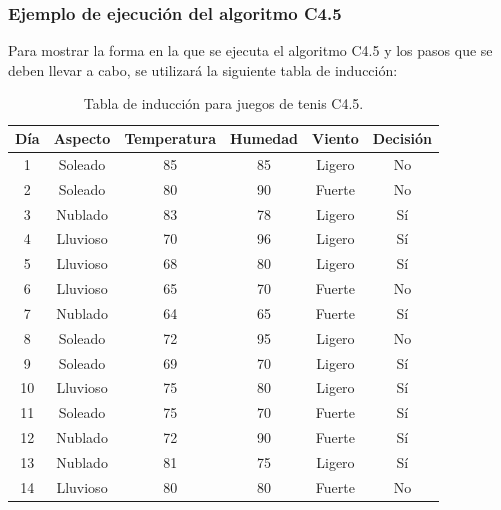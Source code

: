 \subsubsection{Ejemplo de ejecución del algoritmo C4.5}
Para mostrar la forma en la que se ejecuta el algoritmo C4.5 y los pasos que se deben llevar a cabo, se utilizará la siguiente tabla de inducción:

\begin{table}[H]
	\begin{center}
		\label{tab:tablaInduccionC4.5}
		\begin{tabular}{c|c|c|c|c|c}
			\textbf{Día} & \textbf{Aspecto} & \textbf{Temperatura} & \textbf{Humedad} & \textbf{Viento} & \textbf{Decisión}\\
			\hline
			1 & Soleado & 85 & 85 & Ligero & No\\
			2 & Soleado & 80 & 90 & Fuerte & No\\
			3 & Nublado & 83 & 78 & Ligero & Sí\\
			4 & Lluvioso & 70 & 96 & Ligero & Sí\\
			5 & Lluvioso & 68 & 80 & Ligero & Sí\\
			6 & Lluvioso & 65 & 70 & Fuerte & No\\
			7 & Nublado & 64 & 65 & Fuerte & Sí\\
			8 & Soleado & 72 & 95 & Ligero & No\\
			9 & Soleado & 69 & 70 & Ligero & Sí\\
			10 & Lluvioso & 75 & 80 & Ligero & Sí\\
			11 & Soleado & 75 & 70 & Fuerte & Sí\\
			12 & Nublado & 72 & 90 & Fuerte & Sí\\
			13 & Nublado & 81 & 75 & Ligero & Sí\\
			14 & Lluvioso & 80 & 80 & Fuerte & No\\
		\end{tabular}
	\end{center}
	\caption{Tabla de inducción para juegos de tenis C4.5.}
\end{table}

